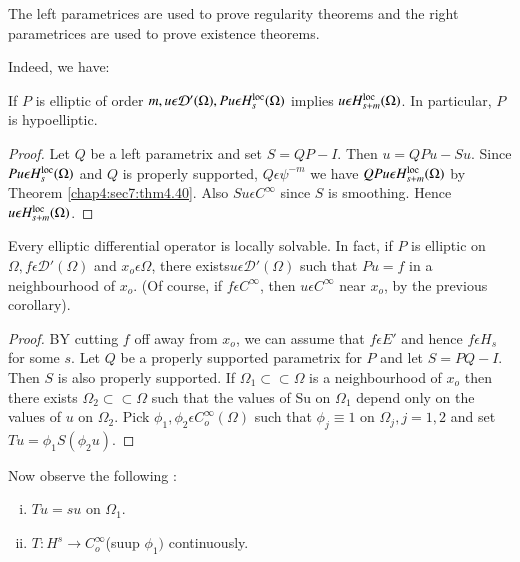 The left parametrices are used to prove regularity theorems and the
right parametrices are used to prove existence theorems. 

Indeed, we have:
\setcounter{coro}{44}
\begin{coro}\label{chap4:sec8:coro4.45}%
  If $P$ is elliptic of order $m, u
  \epsilon \mathcal{D}' (\Omega), Pu \epsilon
  H^{\operatorname{loc}}_{s}(\Omega)$ implies $u \epsilon
  H^{\operatorname{loc}}_{s+m}(\Omega)$. In particular, $P$ is hypoelliptic. 
\end{coro}

\begin{proof}
  Let $Q$ be a left parametrix and set $S = QP-I$. Then $u = QPu -
  Su$. Since$Pu \epsilon H^{\operatorname{loc}}_{s}(\Omega)$ and $Q$ is properly
  supported, $Q \epsilon \psi^{-m}$ we have $QPu \epsilon
  H^{\operatorname{loc}}_{s+m}(\Omega)$ by Theorem \ref{chap4:sec7:thm4.40}. Also $Su \epsilon
  C^{\infty}$ since $S$ is smoothing. Hence $u \epsilon
  H^{\operatorname{loc}}_{s+m}(\Omega)$. 
\end{proof}

\setcounter{thm}{45}
\begin{thm}\label{chap4:sec8:thm4.46} %
  Every elliptic differential operator is locally solvable. In fact,
  if $P$ is elliptic on $\Omega, f \epsilon \mathcal{D}'(\Omega)$
  and $x_o \epsilon \Omega$, there exists\pageoriginale $u \epsilon
  \mathcal{D}'(\Omega)$ such that $Pu =f$ in a neighbourhood of
  $x_o$. (Of course, if $f \epsilon C^{\infty}$, then $u
  \epsilon C^{\infty}$ near $x_o$, by the previous corollary).
\end{thm}

\begin{proof}
  BY cutting $f$ off away from $x_o$, we can assume that $ f \epsilon
  E'$ and hence $ f \epsilon H_s$ for some $s$. Let $Q$ be a properly
  supported parametrix for $P$ and let $S = PQ -I$. Then $S$  is also
  properly supported. If $\Omega_1 \subset \subset \Omega$ is a
  neighbourhood of $x_o$ then there  exists $\Omega_2 \subset \subset
  \Omega$ such that the values of Su on $\Omega_1$ depend only on the
  values of $u$ on $\Omega_2$. Pick $\phi_1, \phi_2 \epsilon
  C^{\infty}_o(\Omega)$ such that $\phi_j \equiv 1$ on $\Omega_j, j =
  1,2$ and set $Tu = \phi_1 S(\phi_2 u)$. 
\end{proof}

Now observe the following :
\begin{enumerate}[i)]
\item $Tu = su $ on $\Omega_1$.
\item $T : H^s \to C^{\infty}_o$(suup $\phi_1)$ continuously.
\end{enumerate}

